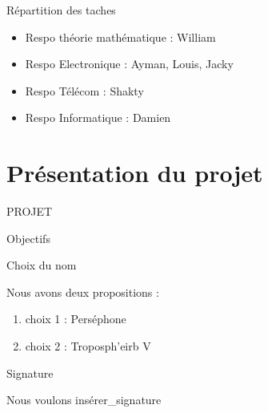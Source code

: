 \documentclass{beamer}
\begin{document}
	
	\begin{frame}{Répartition des taches}
		
		\begin{itemize}
			
			\item Respo théorie mathématique : William
			\item Respo Electronique : Ayman, Louis, Jacky
			\item Respo Télécom : Shakty
			\item Respo Informatique : Damien
		\end{itemize}

	\end{frame}



\section{Présentation du projet}
	
	\begin{frame}

		\begin{center}
			
			\Huge PROJET
		\end{center}
	\end{frame}
	

	\begin{frame}{Objectifs}

		\begin{block}{Choix du nom}

			Nous avons deux propositions :
			\begin{enumerate}
				
				\item choix 1 : Perséphone
				\item choix 2 : Troposph'eirb V
			\end{enumerate}
		\end{block}
		
		


		\begin{block}{Signature}

			Nous voulons insérer\_signature
		\end{block}
		
	\end{frame}
\end{document}
